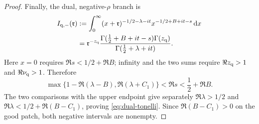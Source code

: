 \begin{proof}
Finally, the dual, negative-$\rho$ branch is
\begin{align}
 I_{{\rm q},-}(\mathfrak r)
 &:=\int_0^\infty(x+\mathfrak r)^{-1/2-\lambda-it}
       x^{-1/2+B+it-s}\,\mathrm d x\notag\\
 &=\mathfrak r^{-z_{\rm q}}
   \frac{\Gamma(\frac12+B+it-s)\Gamma(z_{\rm q})}
        {\Gamma(\frac12+\lambda+it)}.
 \label{eq:four-beta-qm}
\end{align}
Here $x=0$ requires $\Re s<1/2+\Re B$; infinity and the two sums require
$\Re z_{\rm q}>1$ and $\Re\nu_{\rm q}>1$.  Therefore
\[
 \max\{1-\Re(\lambda-B),\Re(\lambda+C_1)\}
 <\Re s<\frac12+\Re B.
\]
The two comparisons with the upper endpoint give separately
$\Re\lambda>1/2$ and
$\Re\lambda<1/2+\Re(B-C_1)$, proving
\eqref{eq:dual-tonelli}.  Since $\Re(B-C_1)>0$ on the good patch, both
negative intervals are nonempty.


\end{proof}
